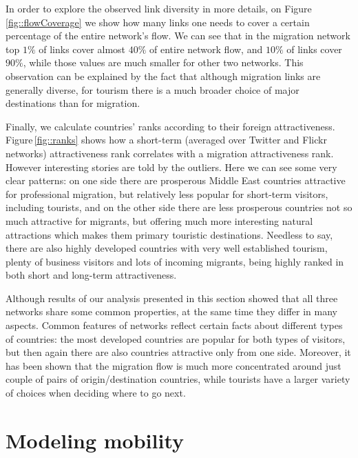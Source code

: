\documentclass[aps,superscriptaddress,showkeys,nofootinbib]{revtex4-1}
\begin{document}
In order to explore the observed link diversity in more details, on Figure\,\ref{fig::flowCoverage} we show how many links one needs to cover a certain percentage of the entire network's flow. We can see that in the migration network top $1\%$ of links cover almost $40\%$ of entire network flow, and $10\%$ of links cover $90\%$, while those values are much smaller for other two networks. This observation can be explained by the fact that although migration links are generally diverse, for tourism there is a much broader choice of major destinations than for migration.

Finally, we calculate countries' ranks according to their foreign attractiveness. Figure\,\ref{fig::ranks} shows how a short-term (averaged over Twitter and Flickr networks) attractiveness rank correlates with a migration attractiveness rank. However interesting stories are told by the outliers. Here we can see some very clear patterns: on one side there are prosperous Middle East countries attractive for professional migration, but relatively less popular for short-term visitors, including tourists, and on the other side there are less prosperous countries not so much attractive for migrants, but offering much more interesting natural attractions which makes them primary touristic destinations. Needless to say, there are also highly developed countries with very well established tourism, plenty of business visitors and lots of incoming migrants, being highly ranked in both short and long-term attractiveness.

Although results of our analysis presented in this section showed that all three networks share some common properties, at the same time they differ in many aspects. Common features of networks reflect certain facts about different types of countries: the most developed countries are popular for both types of visitors, but then again there are also countries attractive only from one side. Moreover, it has been shown that the migration flow is much more concentrated around just couple of pairs of origin/destination countries, while tourists have a larger variety of choices when deciding where to go next.

\section{Modeling mobility}
\label{sec:models}
\end{document}
